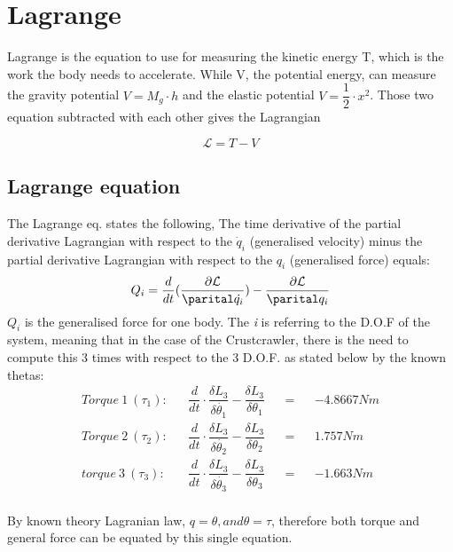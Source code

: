 \section{Lagrange}
Lagrange is the equation to use for measuring the kinetic energy T, which is the work the body needs to accelerate. While V, the potential energy, can measure the gravity potential \(V=M_g\cdot h\) and the elastic potential \(V=\dfrac{1}{2}\cdot x^2\). Those two equation subtracted with each other gives the Lagrangian 

\begin{equation}
    \mathcal{L}=T-V
\end{equation}

\subsection*{Lagrange equation}

The Lagrange eq. states the following, The time derivative of the partial derivative Lagrangian with respect to the $\Dot{q}_i$ (generalised velocity) minus the partial derivative Lagrangian with respect to the $q_i$ (generalised force) equals:
\begin{equation}
    Q_i = \frac{d}{dt}(\frac{\partial\mathcal{L}}{\parital \Dot{q_i}})-\frac{\partial\mathcal{L}}{\parital q_i}
\end{equation}
$Q_i$ is the generalised force for one body. The \textit{i} is referring to the D.O.F of the system, meaning that in the case of the Crustcrawler, there is the need to compute this 3 times with respect to the 3 D.O.F. as stated below by the known thetas:\\

\begin{align*}
    Torque\ 1\ (\tau_1):&& \dfrac{d}{dt}\cdot\dfrac{\delta L_3}{\delta\dot{\theta_1}}-\dfrac{\delta L_3}{\delta\theta_1}&&=&&-4.8667Nm\\
    Torque\ 2\ (\tau_2):&& \dfrac{d}{dt}\cdot\dfrac{\delta L_3}{\delta \dot{\theta_2}}-\dfrac{\delta L_3}{\delta\theta_2}&&=&& 1.757Nm\\
    torque\ 3\ (\tau_3):&&\dfrac{d}{dt}\cdot\dfrac{\delta L_3}{\delta \dot{\theta_3}}-\dfrac{\delta L_3}{\delta\theta_3}&&=&&-1.663Nm
\end{align*}
\\

By known theory Lagranian law, \(q=\theta, and \theta=\tau\), therefore both torque and general force can be equated by this single equation.
 
